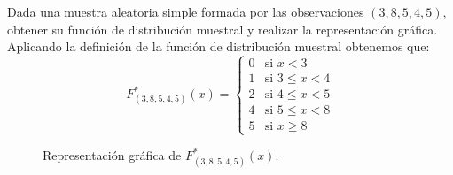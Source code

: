 \begin{ejercicio}
    Dada una muestra aleatoria simple formada por las observaciones $(3, 8, 5, 4, 5)$, obtener su función de distribución muestral y realizar la representación gráfica.\\

    \noindent
    Aplicando la definición de la función de distribución muestral obtenemos que:
    \begin{equation*}
        F_{(3, 8, 5, 4, 5)}^\ast(x) = \left\{\begin{array}{ll}
                0 & \text{si\ } x < 3 \\
                1 & \text{si\ } 3 \leq x < 4 \\
                2 & \text{si\ } 4 \leq x < 5 \\
                4 & \text{si\ } 5 \leq x < 8 \\
                5 & \text{si\ } x \geq 8 
        \end{array}\right.
    \end{equation*}

    \begin{figure}[H]
        \centering
        \caption{Representación gráfica de $F_{(3,8,5,4,5)}^\ast (x)$.}
    \end{figure}
\end{ejercicio}

